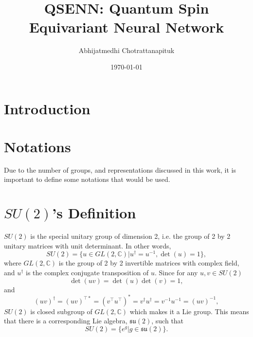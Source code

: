 \documentclass[12pt]{revtex4-2}
\begin{document}
\title{QSENN: Quantum Spin Equivariant Neural Network}
\author{Abhijatmedhi Chotrattanapituk}

\date{\today}
\maketitle

\section{Introduction}


\section{Notations}
Due to the number of groups, and representations discussed in this work, it is important to define some notations that would be used. 

\section{$SU(2)$'s Definition}
$SU(2)$ is the special unitary group of dimension 2, i.e. the group of 2 by 2 unitary matrices with unit determinant. In other words,
\begin{equation}
    SU(2) = \{u \in GL(2, \mathbb{C})|u^\dagger=u^{-1}, \det(u) = 1\},
\end{equation}    
where $GL(2,\mathbb{C})$ is the group of 2 by 2 invertible matrices with complex field, and $u^\dagger$ is the complex conjugate transposition of $u$. Since for any $u, v \in SU(2)$
\begin{equation}
    \det(uv) = \det(u)\det(v) = 1,
\end{equation}
and
\begin{equation}
    (uv)^\dagger = (uv)^{\top\ast} = (v^\top u^\top)^\ast = v^\dagger u^\dagger = v^{-1}u^{-1} = (uv)^{-1},
\end{equation}
$SU(2)$ is closed subgroup of $GL(2, \mathbb{C})$ which makes it a Lie group. This means that there is a corresponding Lie algebra, $\mathfrak{su(2)}$, such that 
\begin{equation}
    SU(2) = \{e^g|g \in \mathfrak{su(2)}\}.
\end{equation}
\end{document}
